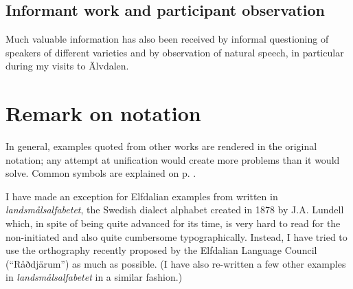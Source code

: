 
\subsection{Informant work and participant observation}
Much\textbf{ }valuable information has also been received by informal questioning of speakers of different varieties and by observation of natural speech, in particular during my visits to Älvdalen. 


\section{Remark on notation}

In general, examples quoted from other works are rendered in the original notation; any attempt at unification would create more problems than it would solve. Common symbols are explained on p. \pageref{bkm:Ref224104485}.


I have made an exception for Elfdalian examples from \citet{Levander1909} written in \textit{landsmålsalfabetet}, the Swedish dialect alphabet created in 1878 by J.A. Lundell which, in spite of being quite advanced for its time, is very hard to read for the non-initiated and also quite cumbersome typographically. Instead, I have tried to use the orthography recently proposed by the Elfdalian Language Council (“Råðdjärum”) as much as possible. (I have also re-written a few other examples in \textit{landsmålsalfabetet }in a similar fashion.)

